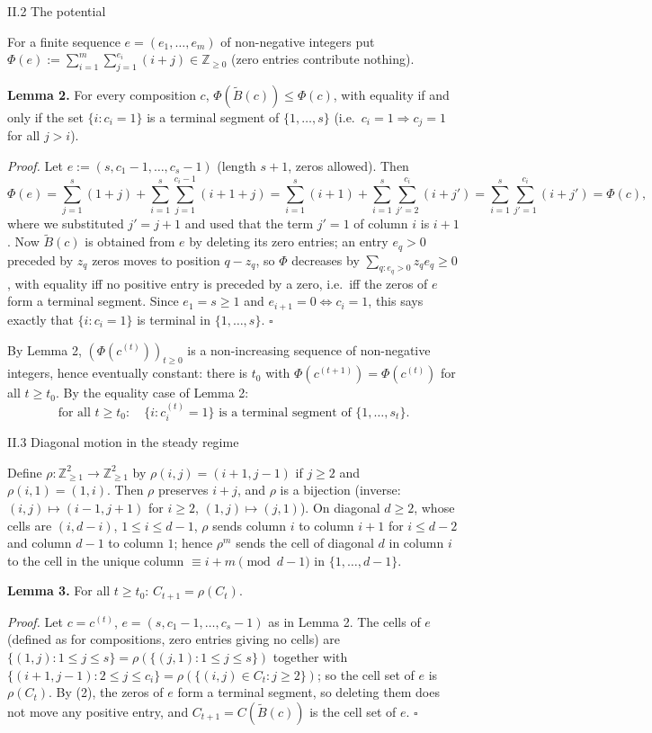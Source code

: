 \documentclass[11pt,a4paper]{article}
\begin{document}
II.2 The potential

For a finite sequence \(e=(e_1,\dots,e_m)\) of non-negative integers put
\(\Phi(e):=\sum_{i=1}^m\sum_{j=1}^{e_i}(i+j)\in\mathbb Z_{\ge0}\) (zero
entries contribute nothing).

\textbf{Lemma 2.} For every composition \(c\),
\(\Phi(\tilde B(c))\le\Phi(c)\), with equality if and only if the set
\(\{i: c_i=1\}\) is a terminal segment of \(\{1,\dots,s\}\)
(i.e.~\(c_i=1\Rightarrow c_j=1\) for all \(j>i\)).

\emph{Proof.} Let \(e:=(s,c_1-1,\dots,c_s-1)\) (length \(s+1\), zeros
allowed). Then
\[\Phi(e)=\sum_{j=1}^{s}(1+j)+\sum_{i=1}^{s}\sum_{j=1}^{c_i-1}(i+1+j)=\sum_{i=1}^{s}(i+1)+\sum_{i=1}^{s}\sum_{j'=2}^{c_i}(i+j')=\sum_{i=1}^{s}\sum_{j'=1}^{c_i}(i+j')=\Phi(c),\]
where we substituted \(j'=j+1\) and used that the term \(j'=1\) of
column \(i\) is \(i+1\). Now \(\tilde B(c)\) is obtained from \(e\) by
deleting its zero entries; an entry \(e_q>0\) preceded by \(z_q\) zeros
moves to position \(q-z_q\), so \(\Phi\) decreases by
\(\sum_{q:e_q>0}z_q e_q\ge0\), with equality iff no positive entry is
preceded by a zero, i.e.~iff the zeros of \(e\) form a terminal segment.
Since \(e_1=s\ge1\) and \(e_{i+1}=0\iff c_i=1\), this says exactly that
\(\{i:c_i=1\}\) is terminal in \(\{1,\dots,s\}\). \(\square\)

By Lemma 2, \((\Phi(c^{(t)}))_{t\ge0}\) is a non-increasing sequence of
non-negative integers, hence eventually constant: there is \(t_0\) with
\(\Phi(c^{(t+1)})=\Phi(c^{(t)})\) for all \(t\ge t_0\). By the equality
case of Lemma 2:
\[\text{for all }t\ge t_0:\quad \{i:c^{(t)}_i=1\}\text{ is a terminal segment of }\{1,\dots,s_t\}. \tag{2}\]

II.3 Diagonal motion in the steady regime

Define \(\rho:\mathbb Z_{\ge1}^2\to\mathbb Z_{\ge1}^2\) by
\(\rho(i,j)=(i+1,j-1)\) if \(j\ge2\) and \(\rho(i,1)=(1,i)\). Then
\(\rho\) preserves \(i+j\), and \(\rho\) is a bijection (inverse:
\((i,j)\mapsto(i-1,j+1)\) for \(i\ge2\), \((1,j)\mapsto(j,1)\)). On
diagonal \(d\ge2\), whose cells are \((i,d-i)\), \(1\le i\le d-1\),
\(\rho\) sends column \(i\) to column \(i+1\) for \(i\le d-2\) and
column \(d-1\) to column \(1\); hence \(\rho^m\) sends the cell of
diagonal \(d\) in column \(i\) to the cell in the unique column
\(\equiv i+m \pmod{d-1}\) in \(\{1,\dots,d-1\}\).

\textbf{Lemma 3.} For all \(t\ge t_0\): \(C_{t+1}=\rho(C_t)\).

\emph{Proof.} Let \(c=c^{(t)}\), \(e=(s,c_1-1,\dots,c_s-1)\) as in Lemma
2. The cells of \(e\) (defined as for compositions, zero entries giving
no cells) are \(\{(1,j):1\le j\le s\}=\rho(\{(j,1):1\le j\le s\})\)
together with
\(\{(i+1,j-1):2\le j\le c_i\}=\rho(\{(i,j)\in C_t: j\ge2\})\); so the
cell set of \(e\) is \(\rho(C_t)\). By (2), the zeros of \(e\) form a
terminal segment, so deleting them does not move any positive entry, and
\(C_{t+1}=C(\tilde B(c))\) is the cell set of \(e\). \(\square\)
\end{document}
